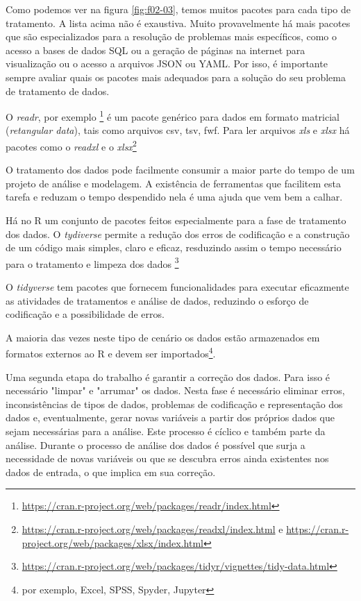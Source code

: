 \documentclass[12pt,a4paper,oneside]{erdc}
\begin{document}
Como podemos ver na figura \ref{fig:f02-03}, temos muitos pacotes para cada tipo de tratamento. A lista acima não é exaustiva. Muito provavelmente há mais pacotes que são especializados para a resolução de problemas mais específicos, como o acesso a bases de dados SQL ou a geração de páginas na internet para visualização ou o acesso a arquivos JSON ou YAML. Por isso, é importante sempre avaliar quais os pacotes mais adequados para a solução do seu problema de tratamento de dados.

 O \textit{readr}, por exemplo \footnote{\url{https://cran.r-project.org/web/packages/readr/index.html}} é um pacote genérico para dados em formato matricial (\textit{retangular data}), tais como arquivos csv, tsv, fwf. Para ler arquivos \textit{xls} e \textit{xlsx} há pacotes como o \textit{readxl} e o \textit{xlsx}\footnote{\url{https://cran.r-project.org/web/packages/readxl/index.html} e \url{https://cran.r-project.org/web/packages/xlsx/index.html}}


O tratamento dos dados pode facilmente consumir a maior parte do tempo de um projeto de análise e modelagem. A existência de ferramentas que facilitem esta tarefa e reduzam o tempo despendido nela é uma ajuda que vem bem a calhar.

Há no R um conjunto de pacotes feitos especialmente para a fase de tratamento dos dados. O \textit{tydiverse} \cite{Wickham2014} permite a redução dos erros de codificação e a construção de um código mais simples, claro e eficaz, resduzindo assim o tempo necessário para o tratamento e limpeza dos dados \footnote{\url{https://cran.r-project.org/web/packages/tidyr/vignettes/tidy-data.html}}


O \textit{tidyverse} tem  pacotes  que fornecem funcionalidades para executar eficazmente as atividades de tratamentos e análise de dados, reduzindo o esforço de codificação e a possibilidade de erros. 

A maioria das vezes neste tipo de cenário os dados estão armazenados em formatos externos ao R e devem ser importados\footnote{por exemplo, Excel, SPSS, Spyder, Jupyter}. 

Uma segunda etapa do trabalho é garantir a correção dos dados. Para isso é necessário "limpar" e "arrumar" os dados. Nesta fase é necessário eliminar erros, inconsistências de tipos de dados, problemas de codificação e representação dos dados e, eventualmente, gerar novas variáveis a partir dos próprios dados que sejam necessárias para a análise. Este processo é cíclico e também parte da análise. Durante o processo de análise dos dados é possível que surja a necessidade de novas variáveis ou que se descubra erros ainda existentes nos dados de entrada, o que implica em sua correção. 
\end{document}
